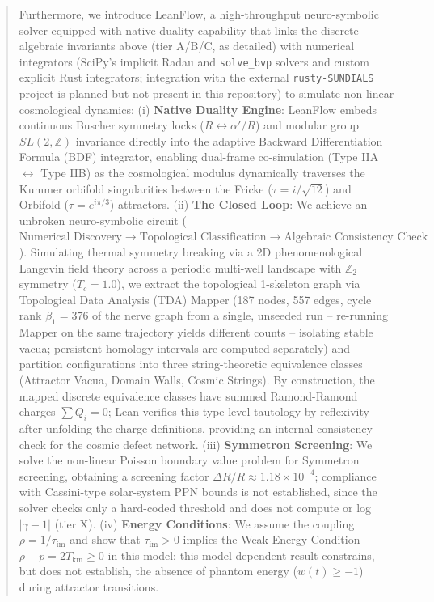 \documentclass[11pt,a4paper]{article}
\newcommand{\numreconcile}[2]{#1}
\begin{document}
\begin{abstract}
Furthermore, we introduce LeanFlow, a high-throughput neuro-symbolic solver equipped with native duality capability that links the discrete algebraic invariants above (tier A/B/C, as detailed) with numerical integrators (SciPy's implicit Radau and \texttt{solve\_bvp} solvers and custom explicit Rust integrators; integration with the external \texttt{rusty-SUNDIALS} project is planned but not present in this repository) to simulate non-linear cosmological dynamics:
(i) \textbf{Native Duality Engine}: LeanFlow embeds continuous Buscher symmetry locks ($R \leftrightarrow \alpha'/R$) and modular group $SL(2, \mathbb{Z})$ invariance directly into the adaptive Backward Differentiation Formula (BDF) integrator, enabling dual-frame co-simulation (Type IIA $\leftrightarrow$ Type IIB) as the cosmological modulus dynamically traverses the Kummer orbifold singularities between the Fricke ($\tau = i/\sqrt{12}$) and Orbifold ($\tau = e^{i\pi/3}$) attractors.
(ii) \textbf{The Closed Loop}: We achieve an unbroken neuro-symbolic circuit ($\text{Numerical Discovery} \to \text{Topological Classification} \to \text{Algebraic Consistency Check}$). Simulating thermal symmetry breaking via a 2D phenomenological Langevin field theory across a periodic multi-well landscape with $\mathbb{Z}_2$ symmetry ($T_c = 1.0$), we extract the topological 1-skeleton graph via Topological Data Analysis (TDA) Mapper (\numreconcile{187}{Mapper nodes} nodes, \numreconcile{557}{Mapper edges} edges, cycle rank $\beta_1 = \numreconcile{376}{cycle rank}$ of the nerve graph from a single, unseeded run -- re-running Mapper on the same trajectory yields different counts -- isolating stable vacua; persistent-homology intervals are computed separately) and partition configurations into three string-theoretic equivalence classes (Attractor Vacua, Domain Walls, Cosmic Strings). By construction, the mapped discrete equivalence classes have summed Ramond-Ramond charges $\sum Q_i = 0$; Lean verifies this type-level tautology by reflexivity after unfolding the charge definitions, providing an internal-consistency check for the cosmic defect network.
(iii) \textbf{Symmetron Screening}: We solve the non-linear Poisson boundary value problem for Symmetron screening, obtaining a screening factor $\Delta R/R \approx \numreconcile{1.18\times 10^{-4}}{screening factor}$; compliance with Cassini-type solar-system PPN bounds is not established, since the solver checks only a hard-coded threshold and does not compute or log $|\gamma - 1|$ (tier X).
(iv) \textbf{Energy Conditions}: We assume the coupling $\rho = 1/\tau_{\text{im}}$ and show that $\tau_{\text{im}} > 0$ implies the Weak Energy Condition $\rho + p = 2 T_{\text{kin}} \ge 0$ in this model; this model-dependent result constrains, but does not establish, the absence of phantom energy ($w(t) \ge -1$) during attractor transitions.

\end{abstract}
\end{document}
